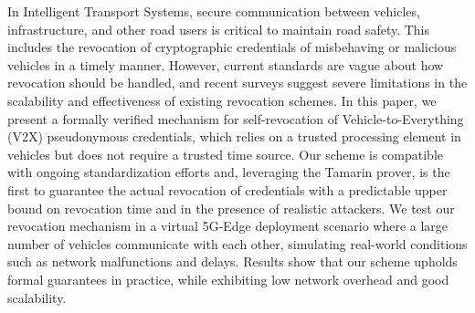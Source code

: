 In Intelligent Transport Systems, secure communication between vehicles,
infrastructure, and other road users is critical to maintain road safety. This
includes the revocation of cryptographic credentials of misbehaving or malicious
vehicles in a timely manner. However, current standards are vague about how
revocation should be handled, and recent surveys suggest severe limitations in
the scalability and effectiveness of existing revocation schemes. In this paper,
we present a formally verified mechanism for self-revocation of
Vehicle-to-Everything (V2X) pseudonymous credentials, which relies on a trusted
processing element in vehicles but does not require a trusted time source. Our
scheme is compatible with ongoing standardization efforts and, leveraging the
Tamarin prover, is the first to guarantee the actual revocation of credentials
with a predictable upper bound on revocation time and in the presence of realistic
attackers. We test our revocation mechanism in a virtual 5G-Edge deployment
scenario where a large number of vehicles communicate with each other,
simulating real-world conditions such as network malfunctions and delays.
Results show that our scheme upholds formal guarantees in practice, while
exhibiting low network overhead and good scalability.
